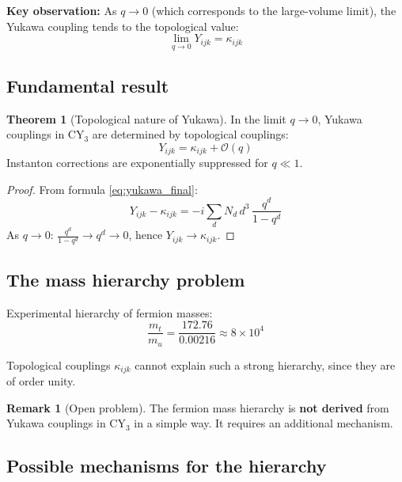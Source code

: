 \documentclass[12pt,a4paper,twoside]{article}
\theoremstyle{definition}
\newtheorem{theorem}{Theorem}[section]
\newtheorem{remark}{Remark}[section]
\begin{document}
\textbf{Key observation:} As $q \to 0$ (which corresponds to the large-volume limit), the Yukawa coupling tends to the topological value:
\begin{equation}
\boxed{
\lim_{q \to 0} Y_{ijk} = \kappa_{ijk}
}
\label{eq:yukawa_limit}
\end{equation}

\subsection{Fundamental result}

\begin{theorem}[Topological nature of Yukawa]
In the limit $q \to 0$, Yukawa couplings in CY$_3$ are determined by topological couplings:
\begin{equation}
Y_{ijk} = \kappa_{ijk} + \mathcal{O}(q)
\end{equation}
Instanton corrections are exponentially suppressed for $q \ll 1$.
\end{theorem}

\begin{proof}
From formula \eqref{eq:yukawa_final}:
\begin{equation}
Y_{ijk} - \kappa_{ijk} = -i \sum_d N_d \, d^3 \, \frac{q^d}{1-q^d}
\end{equation}
As $q \to 0$: $\frac{q^d}{1-q^d} \to q^d \to 0$, hence $Y_{ijk} \to \kappa_{ijk}$.
\end{proof}

\subsection{The mass hierarchy problem}

Experimental hierarchy of fermion masses:
\begin{equation}
\frac{m_t}{m_u} = \frac{172.76}{0.00216} \approx 8 \times 10^4
\label{eq:hierarchy}
\end{equation}

Topological couplings $\kappa_{ijk}$ cannot explain such a strong hierarchy, since they are of order unity.

\begin{remark}[Open problem]
The fermion mass hierarchy is \textbf{not derived} from Yukawa couplings in CY$_3$ in a simple way. It requires an additional mechanism.
\end{remark}

\subsection{Possible mechanisms for the hierarchy}
\end{document}
